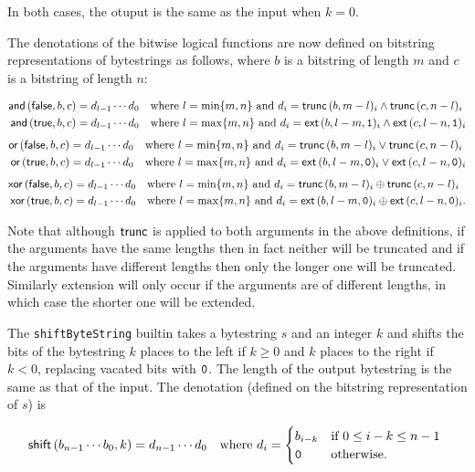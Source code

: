 \noindent In both cases, the otuput is the same as the input when $k=0$.
\smallskip

\noindent The denotations of the bitwise logical functions are now defined on bitstring
representations of bytestrings as follows, where $b$ is a bitstring of length $m$ and $c$
is a bitstring of length $n$:

\begin{align*}
\mathsf{and}\,(\mathsf{false}, b, c) &= d_{l-1} \cdots d_0 
\quad \text{where $l=\min\{m,n\}$ and $d_i = \mathbf{\mathsf{trunc}}\,(b,m-l)_i \wedge \mathbf{\mathsf{trunc}}\,(c,n-l)_i$}\\
\mathsf{and}\,(\mathsf{true}, b, c) &= d_{l-1} \cdots d_0
\quad \text{where $l=\max\{m,n\}$ and $d_i = \mathbf{\textsf{ext}}\,(b,l-m,\mathtt{1})_i \wedge \mathbf{\textsf{ext}}\,(c,l-n,\mathtt{1})_i$}
\end{align*}
%
\begin{align*}
\mathsf{or}\,(\mathsf{false}, b, c) &= d_{l-1} \cdots d_0
  \quad \text{where $l=\min\{m,n\}$ and $d_i = \mathbf{\mathsf{trunc}}\,(b,m-l)_i \vee \mathbf{\mathsf{trunc}}\,(c,n-l)_i$}\\
\mathsf{or}\,(\mathsf{true}, b, c) &= d_{l-1} \cdots d_0 
\quad \text{where $l=\max\{m,n\}$ and $d_i = \mathbf{\textsf{ext}}\,(b,l-m,\mathtt{0})_i \vee \mathbf{\textsf{ext}}\,(c,l-n,\mathtt{0})_i$}
\end{align*}
%
\begin{align*}
\mathsf{xor}\,(\mathsf{false}, b, c) &= d_{l-1} \cdots d_0
  \quad \text{where $l=\min\{m,n\}$ and $d_i = \mathbf{\mathsf{trunc}}\,(b,m-l)_i \oplus \mathbf{\mathsf{trunc}}\,(c,n-l)_i$}\\
\mathsf{xor}\,(\mathsf{true}, b, c) &= d_{l-1} \cdots d_0 
\quad \text{where $l=\max\{m,n\}$ and $d_i = \mathbf{\textsf{ext}}\,(b,l-m,\mathtt{0})_i \oplus \mathbf{\textsf{ext}}\,(c,l-n,\mathtt{0})_i$}.
\end{align*}

\noindent
Note that although $\mathbf{\mathsf{trunc}}$ is applied to both arguments in the above
definitions, if the arguments have the same lengths then in fact neither will be
truncated and if the arguments have different lengths then only the longer one
will be truncated.  Similarly extension will only occur if the arguments are
of different lengths, in which case the shorter one will be extended.

\label{note:shift}
The \texttt{shiftByteString} builtin takes a bytestring $s$ and an integer $k$ and
shifts the bits of the bytestring $k$ places to the left if $k \geq 0$ and $k$
places to the right if $k < 0$, replacing vacated bits with $\mathtt{0}$.  The
length of the output bytestring is the same as that of the input.  The
denotation (defined on the bitstring representation of $s$) is

$$
\mathsf{shift}\,(b_{n-1} \cdots b_0, k) =
  d_{n-1} \cdots d_0 \quad \text{where }
  d_i = \begin{cases}
     b_{i-k} & \text{if $0 \leq i-k \leq n-1$ }\\
     \mathtt{0} & \text{otherwise.}\\
\end{cases}
$$

